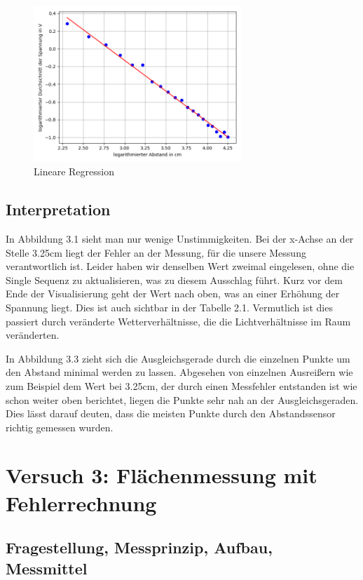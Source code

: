 \documentclass[12pt, oneside, a4paper, \docLanguage]{report}
\begin{document}
\begin{figure}[hbt!]
	\centering\small
	\includegraphics[width=0.7\textwidth]{media/myplot3.png}
	\caption{Lineare Regression}
	\label{fig:Lineare Regression}
\end{figure}
\newpage
\section{Interpretation}
\label{chap:VERSUCH_2_INTERPRETATION}
In Abbildung 3.1 sieht man nur wenige Unstimmigkeiten.
Bei der x-Achse an der Stelle 3.25cm liegt der Fehler an der Messung, für die unsere Messung verantwortlich ist.
Leider haben wir denselben Wert zweimal eingelesen, ohne die Single Sequenz zu aktualisieren, was zu diesem Ausschlag führt.
Kurz vor dem Ende der Visualisierung geht der Wert nach oben, was an einer Erhöhung der Spannung liegt. Dies ist auch sichtbar in der Tabelle 2.1.
Vermutlich ist dies passiert durch veränderte Wetterverhältnisse, die die Lichtverhältnisse im Raum veränderten.
\newline

\newline
In Abbildung 3.3 zieht sich die Ausgleichsgerade durch die einzelnen Punkte um den Abstand minimal werden zu lassen. Abgesehen von einzelnen Ausreißern wie zum Beispiel dem Wert bei 3.25cm, der durch einen Messfehler entstanden ist wie schon weiter oben berichtet, liegen die Punkte sehr nah an der Ausgleichsgeraden.
Dies lässt darauf deuten, dass die meisten Punkte durch den Abstandssensor richtig gemessen wurden.
%
%
\chapter{Versuch 3: Flächenmessung mit Fehlerrechnung}
\label{chap:VERSUCH_3}

\section{Fragestellung, Messprinzip, Aufbau, Messmittel}
\label{chap:VERSUCH_3_FRAGESTELLUNG}
\end{document}
